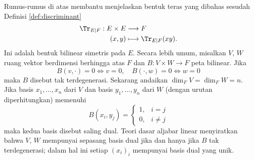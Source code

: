 Rumus-rumus di atas membantu menjelaskan bentuk teras yang dibahas sesudah Definisi \ref{def:discriminant}
\begin{align*}
	\Tr_{E|F}: E \times E & \longrightarrow F \\
	(x,y) & \longmapsto \Tr_{E|F}(xy).
\end{align*}
Ini adalah bentuk bilinear simetris pada $E$. Secara lebih umum, misalkan $V$, $W$ ruang vektor berdimensi berhingga atas $F$ dan $B: V \times W \to F$ peta bilinear. Jika
\[ B(v,\cdot) = 0 \iff v=0, \quad B(\cdot,w)=0 \iff w=0 \]
maka $B$ disebut tak terdegenerasi. Sekarang andaikan $\dim_F V = \dim_F W = n$. Jika basis $x_1, \ldots, x_n$ dari $V$ dan basis $y_1, \ldots, y_n$ dari $W$ (dengan urutan diperhitungkan) memenuhi
\[ B(x_i, y_j) = \begin{cases} 1, & i=j \\ 0, & i \neq j \end{cases} \]
maka kedua basis disebut saling dual. Teori dasar aljabar linear menyiratkan bahwa $V$, $W$ mempunyai sepasang basis dual jika dan hanya jika $B$ tak terdegenerasi; dalam hal ini setiap $(x_i)_i$ mempunyai basis dual yang unik.

